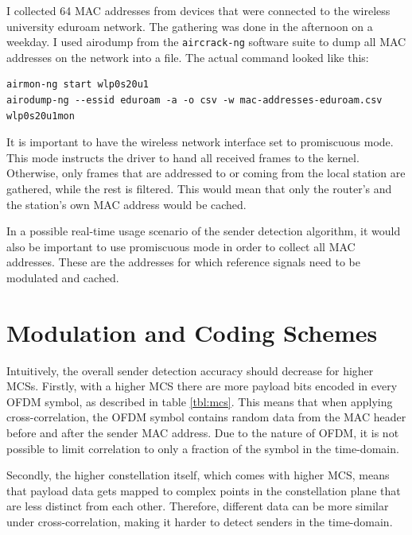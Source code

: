 I collected 64 \gls{MAC} addresses from devices that were connected to the wireless university eduroam network. The gathering was done in the afternoon on a weekday. I used airodump from the \texttt{aircrack-ng} software suite to dump all \gls{MAC} addresses on the network into a file. The actual command looked like this:

\begin{lstlisting}[captionpos=b,caption={Capture Real-World MAC Addresses},label=lst:airodump]
airmon-ng start wlp0s20u1
airodump-ng --essid eduroam -a -o csv -w mac-addresses-eduroam.csv wlp0s20u1mon
\end{lstlisting}

It is important to have the wireless network interface set to promiscuous mode. This mode instructs the driver to hand all received frames to the kernel. Otherwise, only frames that are addressed to or coming from the local station are gathered, while the rest is filtered. This would mean that only the router's and the station's own \gls{MAC} address would be cached.

In a possible real-time usage scenario of the sender detection algorithm, it would also be important to use promiscuous mode in order to collect all \gls{MAC} addresses. These are the addresses for which reference signals need to be modulated and cached.



\section{Modulation and Coding Schemes}

Intuitively, the overall sender detection accuracy should decrease for higher \glspl{MCS}. Firstly, with a higher \gls{MCS} there are more payload bits encoded in every \gls{OFDM} symbol, as described in table \ref{tbl:mcs}. This means that when applying cross-correlation, the \gls{OFDM} symbol contains random data from the \gls{MAC} header before and after the sender \gls{MAC} address. Due to the nature of \gls{OFDM}, it is not possible to limit correlation to only a fraction of the symbol in the time-domain.

Secondly, the higher constellation itself, which comes with higher \gls{MCS}, means that payload data gets mapped to complex points in the constellation plane that are less distinct from each other. Therefore, different data can be more similar under cross-correlation, making it harder to detect senders in the time-domain.\\

